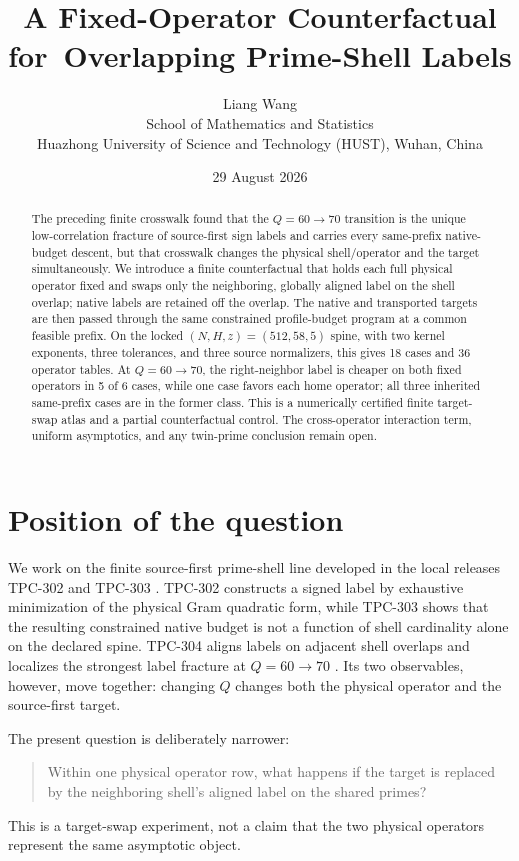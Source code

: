 \documentclass[11pt]{article}
\title{A Fixed-Operator Counterfactual for\
Overlapping Prime-Shell Labels}
\author{Liang Wang\\
School of Mathematics and Statistics\\
Huazhong University of Science and Technology (HUST), Wuhan, China}
\date{29 August 2026}
\begin{document}
\maketitle

\begin{abstract}
The preceding finite crosswalk found that the $Q=60\to70$ transition is the
unique low-correlation fracture of source-first sign labels and carries every
same-prefix native-budget descent, but that crosswalk changes the physical
shell/operator and the target simultaneously.  We introduce a finite
counterfactual that holds each full physical operator fixed and swaps only the
neighboring, globally aligned label on the shell overlap; native labels are
retained off the overlap.  The native and transported targets are then passed
through the same constrained profile-budget program at a common feasible
prefix.  On the locked $(N,H,z)=(512,58,5)$ spine, with two kernel exponents,
three tolerances, and three source normalizers, this gives 18 cases and 36
operator tables.  At $Q=60\to70$, the right-neighbor label is cheaper on both
fixed operators in 5 of 6 cases, while one case favors each home operator; all
three inherited same-prefix cases are in the former class.  This is a
numerically certified finite target-swap atlas and a partial counterfactual
control.  The cross-operator interaction term, uniform asymptotics, and any
twin-prime conclusion remain open.
\end{abstract}

\section{Position of the question}

We work on the finite source-first prime-shell line developed in the local
releases TPC-302 and TPC-303 \cite{tpc302,tpc303}.  TPC-302 constructs a signed
label by exhaustive minimization of the physical Gram quadratic form, while
TPC-303 shows that the resulting constrained native budget is not a function
of shell cardinality alone on the declared spine.  TPC-304 aligns labels on
adjacent shell overlaps and localizes the strongest label fracture at
$Q=60\to70$ \cite{tpc304}.  Its two observables, however, move together:
changing $Q$ changes both the physical operator and the source-first target.

The present question is deliberately narrower:
\begin{quote}
Within one physical operator row, what happens if the target is replaced by the
neighboring shell's aligned label on the shared primes?
\end{quote}
This is a target-swap experiment, not a claim that the two physical operators
represent the same asymptotic object.
\end{document}
